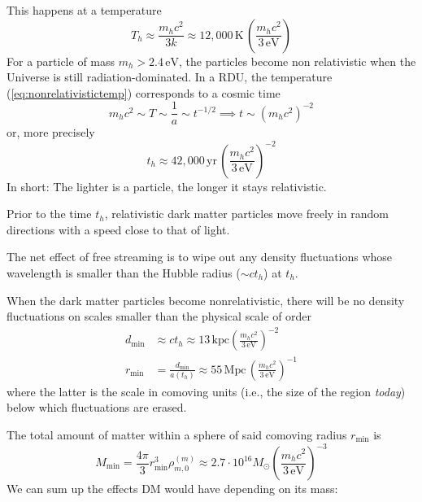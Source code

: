 \par This happens at a temperature
\begin{equation}
    T_{h} \approx \frac{m_{h}c^{2}}{3k}\approx 12,000\,\text{K}\,\left(\frac{m_{h}c^{2}}{3\,\text{eV}}\right)
    \label{eq:nonrelativistictemp}
\end{equation}
For a particle of mass $m_{h}>2.4\,\text{eV}$, the particles become non relativistic when the Universe is still radiation-dominated. In a RDU, the temperature (\ref{eq:nonrelativistictemp}) corresponds to a cosmic time
\begin{equation*}
    m_{h}c^{2}\sim T \sim \frac{1}{a}\sim t^{-1/2} \implies t\sim(m_{h}c^{2})^{-2}
\end{equation*}
or, more precisely
\begin{equation}
    t_{h}\approx 42,000\,\text{yr}\,\left(\frac{m_{h}c^{2}}{3\,\text{eV}}\right)^{-2}
    \label{eq:nonrelativisticepoch}
\end{equation}
In short: The lighter is a particle, the longer it stays relativistic.
\par Prior to the time $t_{h}$, relativistic dark matter particles move freely in random directions with a speed close to that of light.
\par The net effect of free streaming is to wipe out any density fluctuations whose wavelength is smaller than the Hubble radius ($\sim ct_{h}$) at $t_{h}$.
\par When the dark matter particles become nonrelativistic, there will be no density fluctuations on scales smaller than the physical scale of order
\begin{align}
    d_{\text{min}} &\approx ct_{h}\approx 13\,\text{kpc}\left(\frac{m_{h}c^{2}}{3\,\text{eV}}\right)^{-2}\\
    r_{\text{min}} &=\frac{d_{\text{min}}}{a(t_{h})}\approx 55\,\text{Mpc}\,\left(\frac{m_{h}c^{2}}{3\,\text{eV}}\right)^{-1}
    \label{eq:nrdimensions}
\end{align}
where the latter is the scale in comoving units (i.e., the size of the region \emph{today}) below which fluctuations are erased.
\par The total amount of matter within a sphere of said comoving radius $r_{\text{min}}$ is 
\begin{equation}
    M_{\text{min}} = \frac{4\pi}{3}r^{3}_{\text{min}}\rho^{(m)}_{m,0}\approx 2.7\cdot 10^{16}M_{\odot}\left(\frac{m_{h}c^{2}}{3\,\text{eV}}\right)^{-3}
    \label{eq:erasedmass}
\end{equation}
We can sum up the effects DM would have depending on its mass:
